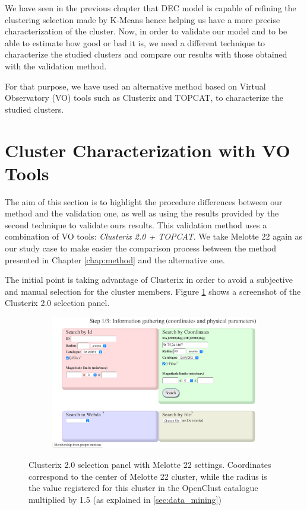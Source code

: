 \documentclass[11pt, a4paper, english]{book}
\begin{document}
We have seen in the previous chapter that DEC model is capable
of refining the clustering selection made by K-Means
hence helping us have a more precise characterization of the cluster.
Now, in order to validate our model and to be able to estimate how good or bad it is,
we need a different technique to characterize the studied clusters and compare our results
with those obtained with the validation method.

For that purpose, we have used an alternative method based on Virtual Observatory (VO) tools
such as Clusterix and TOPCAT, to characterize the studied clusters.

\section{Cluster Characterization with VO Tools}

The aim of this section is to highlight the procedure differences between our method and the validation one,
as well as using the results provided by the second technique to validate ours results.
This validation method uses a combination of VO tools: \emph{Clusterix 2.0 + TOPCAT}.
We take Melotte 22 again as our study case to make easier the comparison process between
the method presented in Chapter \ref{chap:method} and the alternative one.

The initial point is taking advantage of Clusterix in order to avoid a subjective
and manual selection for the cluster members.
Figure \ref{fig:clusterix_selection} shows a screenshot of the Clusterix 2.0 selection panel.

\begin{figure}[htbp]
  \centering
  \begin{subfigure}{0.9\textwidth}
    \centering
    \includegraphics[width=\textwidth]{../figures/clusterix/clusterix_selection_panel_melotte_22.png}
  \end{subfigure}
  \caption{Clusterix 2.0 selection panel with Melotte 22 settings.
           Coordinates correspond to the center of Melotte 22 cluster,
           while the radius is the value registered for this cluster in the
           OpenClust catalogue multiplied by 1.5 (as explained in \ref{sec:data_mining})}
  \label{fig:clusterix_selection}
\end{figure}
\end{document}
